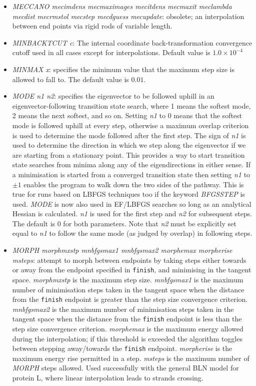 \documentclass[12pt,a4paper,dvips]{article}
\begin{document}
\begin{itemize}
\item {\it MECCANO mecimdens mecmaximages mecitdens mecmaxit meclambda mecdist mecrmstol 
mecstep mecdguess mecupdate\/}: obsolete; an interpolation between 
end points via rigid rods of variable length.

\item {\it MINBACKTCUT c\/}: The internal coordinate back-transformation
  convergence cutoff used in all cases except for interpolations. Default
  value is $1.0\times10^{-4}$

\item {\it MINMAX x\/}: specifies the minimum value that the maximum step size 
is allowed to fall to. The default value is $0.01$.

\item {\it MODE n1 n2\/}: specifies the eigenvector to be followed uphill in an eigenvector-following 
transition state search,
where 1 means the softest mode, 2 means the next softest, and so on.
Setting {\it n1\/} to 0 means that the softest mode is followed uphill at every step,
otherwise a maximum overlap criterion is used to determine the mode followed after the
first step. The sign of {\it n1\/} is used to determine the direction in which we
step along the eigenvector if we are starting from a stationary point. This provides a way
to start transition state searches from minima along any of the eigendirections in
either sense. If a minimisation is started from a converged transition state then setting
{\it n1\/} to $\pm1$ enables the program to walk down the two sides of the pathway. This is true for
runs based on LBFGS techniques too if the keyword {\it BFGSSTEP\/} is used.
{\it MODE\/} is now also used in EF/LBFGS searches so long as an analytical Hessian is
calculated. {\it n1\/} is used for the first step and {\it n2} for subsequent steps. The
default is 0 for both parameters. Note that {\it n2\/} must be explicitly set equal to
{\it n1\/} to follow the same mode (as judged by overlap) in following steps.

\item {\it MORPH morphmxstp mnbfgsmax1 mnbfgsmax2 morphemax morpherise msteps\/}:
attempt to morph between endpoints by taking steps either towards or away from the
endpoint specified in {\tt finish}, and minimising in the tangent space.
{\it morphmxstp\/} is the maximum step size.
{\it mnbfgsmax1\/} is the maximum number of minimisation steps taken in the tangent
space when the distance from the {\tt finish} endpoint is greater than the 
step size convergence criterion.
{\it mnbfgsmax2\/} is the maximum number of minimisation steps taken in the tangent
space when the distance from the {\tt finish} endpoint is less than the
step size convergence criterion.
{\it morphemax\/} is the maximum energy allowed during the interpolation; 
if this threshold is exceeded the algorithm toggles between stepping away/towards
the {\tt finish} endpoint.
{\it morpherise\/} is the maximum energy rise permitted in a step.
{\it msteps\/} is the maximum number of {\it MORPH\/} steps allowed.
Used successfully with the general BLN model for protein L, where linear
interpolation leads to strands crossing.


\end{itemize}
\end{document}
